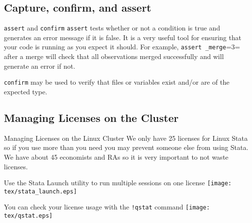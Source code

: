 \documentclass[fleqn, handout, 10pt]{beamer}
\def\tex{S:/trainings/stata/tex}
\def\lst{\lstinline}
\begin{document}
\subsection{Capture, confirm, and assert}


\begin{frame}[fragile]{\lst=assert= and \lst=confirm=}
    \lst=assert= tests whether or not a condition is true and generates an error message if it is false. It is a very useful tool for ensuring that your code is running as you expect it should. For example, \lst=assert _merge==3= after a merge will check that all observations merged successfully and will generate an error if not.

    \lst=confirm= may be used to verify that files or variables exist and/or are of the expected type.
\end{frame}

\subsection{Managing Licenses on the Cluster}
\begin{frame}{Managing Licenses on the Linux Cluster}
    We only have 25 licenses for Linux Stata so if you use more than you need you may prevent someone else from using Stata. We have about 45 economists and RAs so it is very important to not waste licenses.
\end{frame}

\begin{frame}[fragile]{Use the Stata Launch utility to run multiple sessions on one license}
    \texttt{[image: \\tex/stata\_launch.eps]}
\end{frame}

\begin{frame}[fragile]{You can check your license usage with the \lst=!qstat= command}
    \texttt{[image: \\tex/qstat.eps]}
\end{frame}
\end{document}
